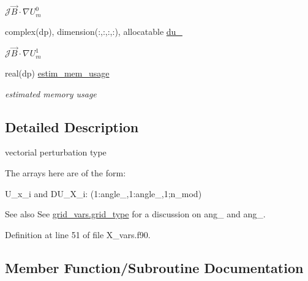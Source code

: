 \begin{DoxyCompactItemize}
\begin{DoxyCompactList}\small\item\em $\mathcal{J}\vec{B}\cdot\nabla U_m^0$ \end{DoxyCompactList}\item 
complex(dp), dimension(\+:,\+:,\+:,\+:), allocatable \hyperlink{structx__vars_1_1x__1__type_a011bea6d3bba4a1ceb5aa6cfd0f3f998}{du\+\_}
\begin{DoxyCompactList}\small\item\em $\mathcal{J}\vec{B}\cdot\nabla U_m^1$ \end{DoxyCompactList}\item 
real(dp) \hyperlink{structx__vars_1_1x__1__type_a98aaf1014e25f61014222339596db565}{estim\+\_\+mem\+\_\+usage}
\begin{DoxyCompactList}\small\item\em estimated memory usage \end{DoxyCompactList}\end{DoxyCompactItemize}


\subsection{Detailed Description}
vectorial perturbation type 

The arrays here are of the form\+:
\begin{DoxyItemize}
\item {\ttfamily U\+\_\+x\+\_\+i} and D\+U\+\_\+\+X\+\_\+i\+: {\ttfamily (1\+:angle\+\_,1\+:angle\+\_,1;n\+\_\+mod)}
\end{DoxyItemize}

\begin{DoxySeeAlso}{See also}
See \hyperlink{structgrid__vars_1_1grid__type}{grid\+\_\+vars.\+grid\+\_\+type} for a discussion on {\ttfamily ang\+\_} and {\ttfamily ang\+\_}. 
\end{DoxySeeAlso}


Definition at line 51 of file X\+\_\+vars.\+f90.



\subsection{Member Function/\+Subroutine Documentation}
\mbox{\label{structx__vars_1_1x__1__type_a8150516389a9cfe7716b0fe70ff6aeab}} 
